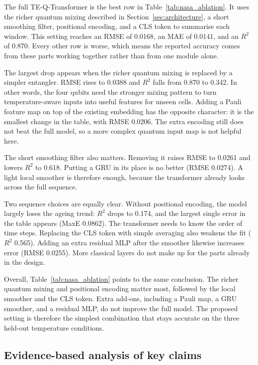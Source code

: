 \documentclass[a4paper,fleqn]{cas-sc}
\begin{document}
The full TE-Q-Transformer is the best row in Table~\ref{tab:nasa_ablation}. It uses the richer quantum mixing described in Section~\ref{sec:architecture}, a short smoothing filter, positional encoding, and a CLS token to summarise each window. This setting reaches an RMSE of 0.0168, an MAE of 0.0141, and an $R^2$ of 0.870. Every other row is worse, which means the reported accuracy comes from these parts working together rather than from one module alone.

The largest drop appears when the richer quantum mixing is replaced by a simpler entangler. RMSE rises to 0.0388 and $R^2$ falls from 0.870 to 0.342. In other words, the four qubits need the stronger mixing pattern to turn temperature-aware inputs into useful features for unseen cells. Adding a Pauli feature map on top of the existing embedding has the opposite character: it is the smallest change in the table, with RMSE 0.0206. The extra encoding still does not beat the full model, so a more complex quantum input map is not helpful here.

The short smoothing filter also matters. Removing it raises RMSE to 0.0261 and lowers $R^2$ to 0.618. Putting a GRU in its place is no better (RMSE 0.0274). A light local smoother is therefore enough, because the transformer already looks across the full sequence.

Two sequence choices are equally clear. Without positional encoding, the model largely loses the ageing trend: $R^2$ drops to 0.174, and the largest single error in the table appears (MaxE 0.0862). The transformer needs to know the order of time steps. Replacing the CLS token with simple averaging also weakens the fit ($R^2$ 0.565). Adding an extra residual MLP after the smoother likewise increases error (RMSE 0.0255). More classical layers do not make up for the parts already in the design.

Overall, Table~\ref{tab:nasa_ablation} points to the same conclusion. The richer quantum mixing and positional encoding matter most, followed by the local smoother and the CLS token. Extra add-ons, including a Pauli map, a GRU smoother, and a residual MLP, do not improve the full model. The proposed setting is therefore the simplest combination that stays accurate on the three held-out temperature conditions.

\subsection{Evidence-based analysis of key claims}\label{sec:discussion}
\end{document}
